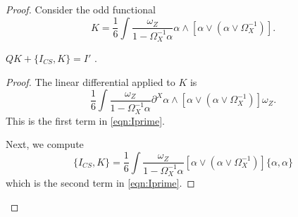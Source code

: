 \documentclass[11pt]{amsart}
\begin{document}
\begin{proof}
Consider the odd functional
\[
K = \frac16 \int \frac{\omega_Z}{1-\Omega^{-1}_X \alpha} \alpha \wedge [\alpha \vee (\alpha \vee \Omega_X^{-1})] .
\]

\begin{lem}
$Q K + \{I_{CS}, K\} = I'$ .
\end{lem}
\begin{proof}
The linear differential applied to $K$ is 
\[
\frac16 \int \frac{\omega_Z}{1-\Omega^{-1}_X \alpha} \partial^X \alpha \wedge [\alpha \vee (\alpha \vee \Omega_X^{-1})] \omega_Z .
\]
This is the first term in \eqref{eqn:Iprime}. 

Next, we compute
\[
\{I_{CS}, K\} = \frac16 \int \frac{\omega_Z}{1-\Omega^{-1}_X \alpha} [\alpha \vee (\alpha \vee \Omega^{-1}_X)] \{\alpha,\alpha\} 
\]
which is the second term in \eqref{eqn:Iprime}. 
\end{proof}
\end{proof}
\end{document}
